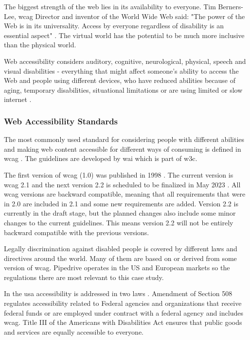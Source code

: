 \documentclass{master_thesis}
\begin{document}
The biggest strength of the web lies in its availability to everyone. Tim Berners-Lee, \ac{wcag} Director and inventor of the World Wide Web said: "The power of the Web is in its universality. Access by everyone regardless of disability is an essential aspect" \citep{WWWC1997}. The virtual world has the potential to be much more inclusive than the physical world.

Web accessibility considers auditory, cognitive, neurological, physical, speech and visual disabilities - everything that might affect someone's ability to access the Web and people using different devices, who have reduced abilities because of aging, temporary disabilities, situational limitations or are using limited or slow internet \citep{Henry2022}.

\subsubsection{Web Accessibility Standards}

The most commonly used standard for considering people with different abilities and making web content accessible for different ways of consuming is defined in \ac{wcag} \citep{Kirkpatrick2018}. The guidelines are developed by \ac{wai} which is part of \ac{w3c}.

The first version of \ac{wcag} (1.0) was published in 1998 \citep{Vanderheiden1998}. The current version is \ac{wcag} 2.1 and the next version 2.2 is scheduled to be finalized in May 2023 \citep{Henry2023}. All \ac{wcag} versions are backward compatible, meaning that all requirements that were in 2.0 are included in 2.1 and some new requirements are added. Version 2.2 is currently in the draft stage, but the planned changes also include some minor changes to the current guidelines. This means version 2.2 will not be entirely backward compatible with the previous versions.

Legally discrimination against disabled people is covered by different laws and directives around the world. Many of them are based on or derived from some version of \ac{wcag}. Pipedrive operates in the US and European markets so the regulations there are most relevant to this case study.

In the \ac{usa} accessibility is addressed in two laws \citep{Siteimprove}. Amendment of Section 508 regulates accessibility related to Federal agencies and organizations that receive federal funds or are employed under contract with a federal agency and includes \ac{wcag}. Title III of the Americans with Disabilities Act ensures that public goods and services are equally accessible to everyone.
\end{document}
